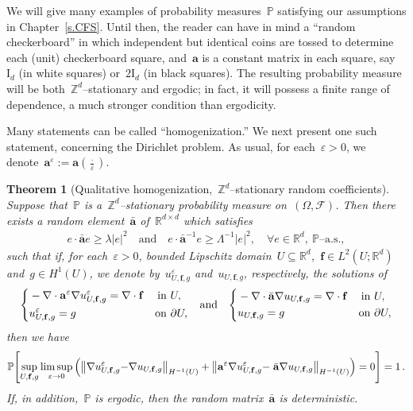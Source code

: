 \documentclass[11pt,twoside]{article} %
\numberwithin{equation}{section}
\newtheorem{theorem}{Theorem}[section]
\theoremstyle{definition}
\let\originalleft\left
\let\originalright\right
\renewcommand{\left}{\mathopen{}\mathclose\bgroup\originalleft}
\renewcommand{\right}{\aftergroup\egroup\originalright}
\newcommand*{\Id}{\ensuremath{\mathrm{I}_d}}
\newcommand*{\Z}{\ensuremath{\mathbb{Z}}}
\newcommand*{\R}{\ensuremath{\mathbb{R}}}
\newcommand*{\Zd}{\ensuremath{\mathbb{Z}^d}}
\newcommand*{\Rd}{\ensuremath{\mathbb{R}^d}}
\newcommand{\eps}{\varepsilon}
\newcommand{\f}{\mathbf{f}}
\newcommand{\ep}{\eps}
\renewcommand{\a}{\mathbf{a}}
\newcommand{\ahom}{\bar{\a}}
\newcommand{\F}{\mathcal{F}}
\renewcommand{\P}{\mathbb{P}}
\begin{document}
\smallskip

We will give many examples of probability measures~$\P$ satisfying our assumptions in Chapter~\ref{s.CFS}. Until then, the reader can have in mind a ``random checkerboard'' in which independent but identical coins are tossed to determine each (unit) checkerboard square, and~$\a$ is a constant matrix in each square, say~$\Id$ (in white squares) or~$2 \Id$ (in black squares). The resulting probability measure will be both~$\Zd$--stationary and ergodic; in fact, it will possess a finite range of dependence, a much stronger condition than ergodicity. 

\smallskip

Many statements can be called ``homogenization.'' We next present one such statement, concerning the Dirichlet problem. As usual, for each~$\ep>0$, we denote~$\a^\ep:=\a(\frac\cdot\ep)$.

\begin{theorem}[Qualitative homogenization,~$\Z^d$--stationary random coefficients]
\label{t.qualitative.homogenization}
Suppose that~$\P$ is a~$\Zd$--stationary probability measure on~$(\Omega,\F)$.
Then there exists a random element~$\ahom$ of~$\R^{d\times d}$ which satisfies 
\begin{align*}
e\cdot \ahom e \geq \lambda |e|^2 \quad \mbox{and} \quad 
e \cdot \ahom^{-1} e 
\geq \Lambda^{-1}  |e|^2, \quad \forall e\in\Rd, \ \P\mbox{--a.s.},
\end{align*}
such that if, for each~$\ep>0$, bounded Lipschitz domain~$U\subseteq\Rd$,~$\mathbf{f} \in L^2(U;\Rd)$ and~$g\in H^1(U)$, we denote by~$u^\ep_{U,\f,g}$ and~${u}_{U,\f,g}$, respectively, the solutions of
\begin{align*}
\left\{
\begin{aligned}
& -\nabla \cdot \a^\ep \nabla u^\ep_{U,\f,g} = \nabla \cdot \f & \mbox{in} & \ U, \\
& u^\ep_{U,\f,g} = g & \mbox{on} & \ \partial U,
\end{aligned}
\right.
\quad \mbox{and} \quad 
\left\{
\begin{aligned}
& -\nabla \cdot \ahom\nabla u_{U,\f,g} = \nabla \cdot \f & \mbox{in} & \ U, \\
& u_{U,\f,g} = g & \mbox{on} & \ \partial U,
\end{aligned}
\right.
\end{align*}
then we have  
\begin{equation}
\label{e.qualhomogP}
\P \left[
\sup_{U,\f,g} 
\limsup_{\ep \to 0}\,
\Bigl(
\bigl\| \nabla u^\ep_{U,\f,g} {-} \nabla u_{U,\f,g} \bigr\|_{H^{-1}(U)}
+
\bigl\| \a^\ep \nabla u^\ep_{U,\f,g} {-}\; \ahom \nabla u_{U,\f,g} \bigr\|_{H^{-1}(U)}
\Bigr)
=0
\right] 
= 
1\,.
\end{equation}
If, in addition,~$\P$ is ergodic, then the random matrix~$\ahom$ is deterministic. 
\end{theorem} 
\end{document}
